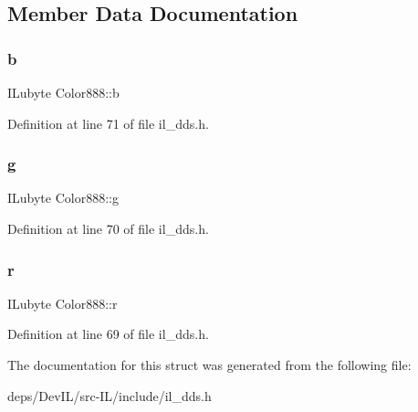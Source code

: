 \subsection{Member Data Documentation}
\mbox{\label{structColor888_a84ecdb42fbfe4a92e5af12c3b7297cf8}} 
\subsubsection{\texorpdfstring{b}{b}}
{\footnotesize\ttfamily I\+Lubyte Color888\+::b}



Definition at line 71 of file il\+\_\+dds.\+h.

\mbox{\label{structColor888_a7618487b7034f4021bc309190a0b73b8}} 
\subsubsection{\texorpdfstring{g}{g}}
{\footnotesize\ttfamily I\+Lubyte Color888\+::g}



Definition at line 70 of file il\+\_\+dds.\+h.

\mbox{\label{structColor888_a813c8eaa1768c7614e87a9d1f6b382d7}} 
\subsubsection{\texorpdfstring{r}{r}}
{\footnotesize\ttfamily I\+Lubyte Color888\+::r}



Definition at line 69 of file il\+\_\+dds.\+h.



The documentation for this struct was generated from the following file\+:\begin{DoxyCompactItemize}
\item 
deps/\+Dev\+I\+L/src-\/\+I\+L/include/il\+\_\+dds.\+h\end{DoxyCompactItemize}
